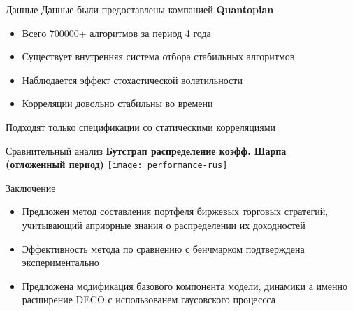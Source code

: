 \documentclass[12pt]{beamer}
\begin{document}
\begin{frame}{Данные}
Данные были предоставлены компанией \textbf{Quantopian}
\begin{itemize}
	\item Всего 700000+ алгоритмов за период 4 года
	\item Существует внутренняя система отбора стабильных алгоритмов
	\item Наблюдается эффект стохастической волатильности
	\item Корреляции довольно стабильны во времени
\end{itemize}
Подходят только спецификации со статическими корреляциями
\end{frame}

\begin{frame}{Сравнительный анализ}
\textbf{Бутстрап распределение коэфф. Шарпа\\(отложенный период)}
\texttt{[image: performance-rus]}
\end{frame}
\begin{frame}{Заключение}
\begin{itemize}
	\item Предложен метод составления портфеля биржевых торговых
стратегий, учитывающий априорные знания о распределении их доходностей
	\item Эффективность метода по сравнению с бенчмарком подтверждена экспериментально
	\item Предложена модификация базового компонента модели, динамики а именно расширение DECO с использованем гаусовского процессса
\end{itemize}
\end{frame}
\end{document}
